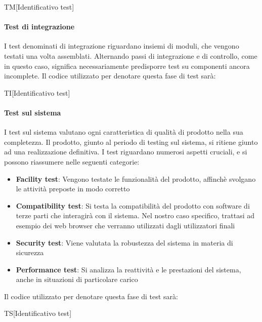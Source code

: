 		\begin{center}
			TM[Identificativo test]
		\end{center}
	
		\paragraph{Test di integrazione}
		I test denominati di integrazione riguardano insiemi di moduli, che vengono testati una volta assemblati. Alternando passi di integrazione e di controllo, come in questo caso, significa necessariamente predisporre test su componenti ancora incomplete. Il codice utilizzato per denotare questa fase di test sarà:
		
		\begin{center}
			TI[Identificativo test]
		\end{center}
		
		\paragraph{Test sul sistema}
		I test sul sistema valutano ogni caratteristica di qualità di prodotto nella sua completezza. Il prodotto, giunto al periodo di testing sul sistema, si ritiene giunto ad una realizzazione definitiva. I test riguardano numerosi aspetti cruciali, e si possono riassumere nelle seguenti categorie:
		
		\begin{itemize}
			\item \textbf{Facility test}: Vengono testate le funzionalità del prodotto, affinchè svolgano le attività preposte in modo corretto
			\item \textbf{Compatibility test}: Si testa la compatibilità del prodotto con software di terze parti che interagirà con il sistema. Nel nostro caso specifico, trattasi ad esempio dei web browser che verranno utilizzati dagli utilizzatori finali
			\item \textbf{Security test}: Viene valutata la robustezza del sistema in materia di sicurezza
			\item \textbf{Performance test}: Si analizza la reattività e le prestazioni del sistema, anche in situazioni di particolare carico
		\end{itemize}
	
		Il codice utilizzato per denotare questa fase di test sarà:
		
		\begin{center}
			TS[Identificativo test]
		\end{center}
	

